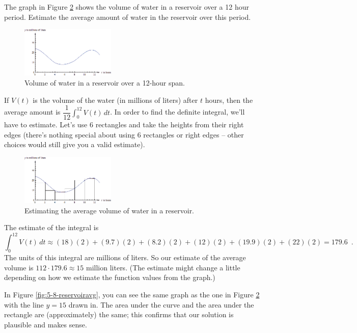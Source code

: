 \begin{example}
The graph in Figure \ref{fig:5-8-reservoir} shows the volume of water in a reservoir over a 12 hour period. Estimate the average amount of water in the reservoir over this period.

\begin{figure}[!ht]
  \centering
    \includegraphics[width=0.4\textwidth]{img/chap5/image055.png}
    \caption{Volume of water in a reservoir over a 12-hour span.}
    \label{fig:5-8-reservoir}
\end{figure}
\begin{solution}
If $V(t)$ is the volume of the water (in millions of liters) after $t$ hours, then the average amount is $\dfrac{1}{12}\displaystyle\int_0^{12}V(t)\,dt$. In order to find the definite integral, we'll have to estimate. Let's use 6 rectangles and take the heights from their right edges (there's nothing special about using 6 rectangles or right edges -- other choices would still give you a valid estimate).

\begin{figure}[!ht]
  \centering
    \includegraphics[width=0.4\textwidth]{img/chap5/image056.png}
    \caption{Estimating the average volume of water in a reservoir.}
    \label{fig:5-8-reservoir}
\end{figure}

The estimate of the integral is
$$\int_0^{12}V(t)\,dt\approx   (18)(2)+(9.7)(2)+(8.2)(2)+(12)(2)+(19.9)(2)+(22)(2)=179.6 \enspace .$$
The units of this integral are millions of liters. So our estimate of the average volume is $112\cdot 179.6 \approx 15$ million liters. (The estimate might change a little depending on how we estimate the function values from the graph.)

In Figure \ref{fig:5-8-reservoiravg}, you can see the same graph as the one in Figure \ref{fig:5-8-reservoir} with the line $y=15$ drawn in. The area under the curve and the area under the rectangle are (approximately) the same; this confirms that our solution is plausible and makes sense.


\end{solution}
\end{example}
